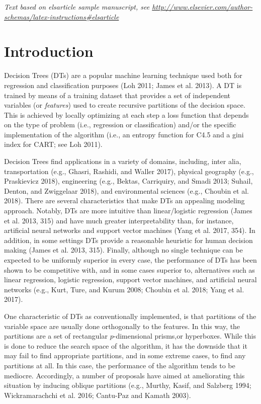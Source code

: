 \documentclass[]{elsarticle} %
\begin{document}
\emph{Text based on elsarticle sample manuscript, see
\url{http://www.elsevier.com/author-schemas/latex-instructions\#elsarticle}}

\section{Introduction}\label{introduction}

Decision Trees (DTs) are a popular machine learning technique used both
for regression and classification purposes (Loh 2011; James et al.
2013). A DT is trained by means of a training dataset that provides a
set of independent variables (or \emph{features}) used to create
recursive partitions of the decision space. This is achieved by locally
optimizing at each step a loss function that depends on the type of
problem (i.e., regression or classification) and/or the specific
implementation of the algorithm (i.e., an entropy function for C4.5 and
a gini index for CART; see Loh 2011).

Decision Trees find applications in a variety of domains, including,
inter alia, transportation (e.g., Ghasri, Rashidi, and Waller 2017),
physical geography (e.g., Praskievicz 2018), engineering (e.g., Bektas,
Carriquiry, and Smadi 2013; Suhail, Denton, and Zwiggelaar 2018), and
environmental sciences (e.g., Choubin et al. 2018). There are several
characteristics that make DTs an appealing modeling approach. Notably,
DTs are more intuitive than linear/logistic regression (James et al.
2013, 315) and have much greater interpretability than, for instance,
artificial neural networks and support vector machines (Yang et al.
2017, 354). In addition, in some settings DTs provide a reasonable
heuristic for human decision making (James et al. 2013, 315). Finally,
although no single technique can be expected to be uniformly superior in
every case, the performance of DTs has been shown to be competitive
with, and in some cases superior to, alternatives such as linear
regression, logistic regression, support vector machines, and artificial
neural networks (e.g., Kurt, Ture, and Kurum 2008; Choubin et al. 2018;
Yang et al. 2017).

One characteristic of DTs as conventionally implemented, is that
partitions of the variable space are usually done orthogonally to the
features. In this way, the partitions are a set of rectangular
\(p\)-dimensional prisms,or hyperboxes. While this is done to reduce the
search space of the algorithm, it has the downside that it may fail to
find appropriate partitions, and in some extreme cases, to find any
partitions at all. In this case, the performance of the algorithm tends
to be mediocre. Accordingly, a number of proposals have aimed at
ameliorating this situation by inducing oblique partitions (e.g.,
Murthy, Kasif, and Salzberg 1994; Wickramarachchi et al. 2016; Cantu-Paz
and Kamath 2003).
\end{document}
